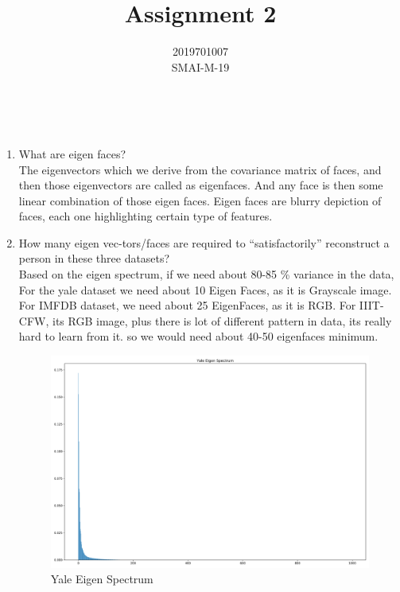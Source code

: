 \documentclass[12pt]{article}
\newenvironment{problem}[2][Problem]{\begin{trivlist}
\item[\hskip \labelsep {\bfseries #1}\hskip \labelsep {\bfseries #2.}]}{\end{trivlist}}
\begin{document}
 
 
\title{Assignment 2}%
\author{2019701007\\ %
SMAI-M-19} %
 
\maketitle

\begin{problem}{1}
	\
	\begin{enumerate}[label=\alph*)]
		\item What are eigen faces?
		\\
		The eigenvectors which we derive from the covariance matrix of faces, and then those eigenvectors are called as eigenfaces. And any face is then some linear combination of those eigen faces. Eigen faces are blurry depiction of faces, each one highlighting certain type of features.
		\item How many eigen vec-tors/faces are required to “satisfactorily” reconstruct a person in these three datasets?
		\\
		Based on the eigen spectrum, if we need about 80-85 \% variance in the data, For the yale dataset we need about 10 Eigen Faces, as it is Grayscale image. For IMFDB dataset, we need about 25 EigenFaces, as it is RGB. For IIIT-CFW, its RGB image, plus there is lot of different pattern in data, its really hard to learn from it. so we would need about 40-50 eigenfaces minimum. 
		\begin{figure}[H]
			\centering
			\includegraphics[totalheight=8cm]{Yale_Eigen_Spectrum.png}
			\caption{Yale Eigen Spectrum}
			\label{fig:verticalcell}
		\end{figure}
		

\end{enumerate}
\end{problem}
\end{document}

